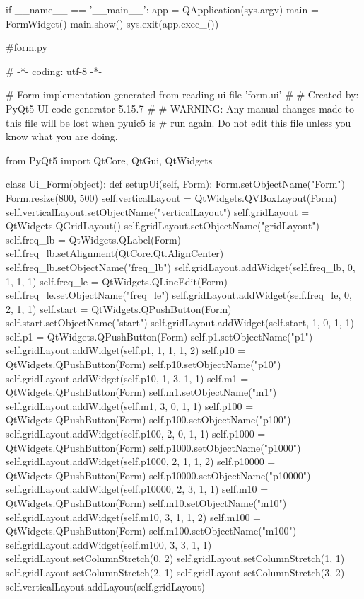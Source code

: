 \documentclass{article}
\begin{document}
\begin{appendices}
\begin{python}
    if __name__ == '__main__':
        app = QApplication(sys.argv)
        main = FormWidget()
        main.show()
        sys.exit(app.exec_())
    \end{python}
    \begin{python}
    #form.py

    
    # -*- coding: utf-8 -*-

    # Form implementation generated from reading ui file 'form.ui'
    #
    # Created by: PyQt5 UI code generator 5.15.7
    #
    # WARNING: Any manual changes made to this file will be lost when pyuic5 is
    # run again.  Do not edit this file unless you know what you are doing.


    from PyQt5 import QtCore, QtGui, QtWidgets


    class Ui_Form(object):
        def setupUi(self, Form):
            Form.setObjectName("Form")
            Form.resize(800, 500)
            self.verticalLayout = QtWidgets.QVBoxLayout(Form)
            self.verticalLayout.setObjectName("verticalLayout")
            self.gridLayout = QtWidgets.QGridLayout()
            self.gridLayout.setObjectName("gridLayout")
            self.freq_lb = QtWidgets.QLabel(Form)
            self.freq_lb.setAlignment(QtCore.Qt.AlignCenter)
            self.freq_lb.setObjectName("freq_lb")
            self.gridLayout.addWidget(self.freq_lb, 0, 1, 1, 1)
            self.freq_le = QtWidgets.QLineEdit(Form)
            self.freq_le.setObjectName("freq_le")
            self.gridLayout.addWidget(self.freq_le, 0, 2, 1, 1)
            self.start = QtWidgets.QPushButton(Form)
            self.start.setObjectName("start")
            self.gridLayout.addWidget(self.start, 1, 0, 1, 1)
            self.p1 = QtWidgets.QPushButton(Form)
            self.p1.setObjectName("p1")
            self.gridLayout.addWidget(self.p1, 1, 1, 1, 2)
            self.p10 = QtWidgets.QPushButton(Form)
            self.p10.setObjectName("p10")
            self.gridLayout.addWidget(self.p10, 1, 3, 1, 1)
            self.m1 = QtWidgets.QPushButton(Form)
            self.m1.setObjectName("m1")
            self.gridLayout.addWidget(self.m1, 3, 0, 1, 1)
            self.p100 = QtWidgets.QPushButton(Form)
            self.p100.setObjectName("p100")
            self.gridLayout.addWidget(self.p100, 2, 0, 1, 1)
            self.p1000 = QtWidgets.QPushButton(Form)
            self.p1000.setObjectName("p1000")
            self.gridLayout.addWidget(self.p1000, 2, 1, 1, 2)
            self.p10000 = QtWidgets.QPushButton(Form)
            self.p10000.setObjectName("p10000")
            self.gridLayout.addWidget(self.p10000, 2, 3, 1, 1)
            self.m10 = QtWidgets.QPushButton(Form)
            self.m10.setObjectName("m10")
            self.gridLayout.addWidget(self.m10, 3, 1, 1, 2)
            self.m100 = QtWidgets.QPushButton(Form)
            self.m100.setObjectName("m100")
            self.gridLayout.addWidget(self.m100, 3, 3, 1, 1)
            self.gridLayout.setColumnStretch(0, 2)
            self.gridLayout.setColumnStretch(1, 1)
            self.gridLayout.setColumnStretch(2, 1)
            self.gridLayout.setColumnStretch(3, 2)
            self.verticalLayout.addLayout(self.gridLayout)


\end{python}
\end{appendices}
\end{document}

